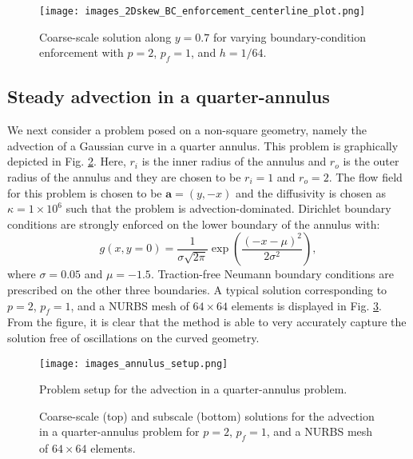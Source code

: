 \documentclass[11pt]{article}
\begin{document}
\begin{figure}[t]
\begin{center}
\texttt{[image: images\_2Dskew\_BC\_enforcement\_centerline\_plot.png]}
\caption{Coarse-scale solution along $y = 0.7$ for varying boundary-condition enforcement with $p = 2$, $p_f = 1$, and $h = 1/64$.}
\label{fig:skew_slice_BC_enforcement}
\end{center}
\end{figure}

\subsection{Steady advection in a quarter-annulus}

We next consider a problem posed on a non-square geometry, namely the advection of a Gaussian curve in a quarter annulus.  This problem is graphically depicted in Fig. \ref{fig:annulus_setup}.  Here, $r_i$ is the inner radius of the annulus and $r_o$ is the outer radius of the annulus and they are chosen to be $r_i = 1$ and $r_o = 2$.  The flow field for this problem is chosen to be $\bm{a} = \left( y, -x \right)$ and the diffusivity is chosen as $\kappa = 1 \times 10^6$ such that the problem is advection-dominated.  Dirichlet boundary conditions are strongly enforced on the lower boundary of the annulus with:
\begin{equation}\label{eq:annulus_bc}
g\left(x,y=0\right) = \frac{1}{\sigma \sqrt{2 \pi}} \exp \left(\frac{(-x-\mu)^2}{2 \sigma^2}\right),
\end{equation}
where $\sigma = 0.05$ and $\mu = -1.5$.  Traction-free Neumann boundary conditions are prescribed on the other three boundaries.  A typical solution corresponding to $p = 2$, $p_f = 1$, and a NURBS mesh of $64 \times 64$ elements is displayed in Fig. \ref{fig:annulus_isometric}.  From the figure, it is clear that the method is able to very accurately capture the solution free of oscillations on the curved geometry.

\begin{figure}[t]
\begin{center}
\texttt{[image: images\_annulus\_setup.png]}
\caption{Problem setup for the advection in a quarter-annulus problem.}
\label{fig:annulus_setup}
\end{center}
\end{figure}

\begin{figure}[t]
  \begin{center}
    \caption{Coarse-scale (top) and subscale (bottom) solutions for the advection in a quarter-annulus problem for $p = 2$, $p_f = 1$, and a NURBS mesh of $64 \times 64$ elements.}
    \label{fig:annulus_isometric}
  \end{center}
\end{figure}
\end{document}
